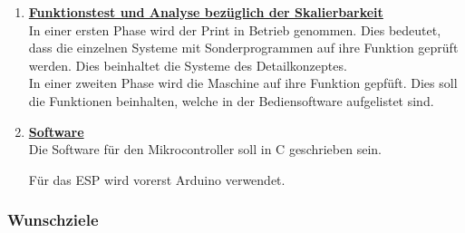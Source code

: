 \begin{enumerate}
\item \underline{\textbf{Funktionstest und Analyse bezüglich der Skalierbarkeit}}\mbox{}\\
			
In einer ersten Phase wird der Print in Betrieb genommen. Dies bedeutet, dass die einzelnen Systeme mit Sonderprogrammen auf ihre Funktion geprüft werden. Dies beinhaltet die Systeme des Detailkonzeptes.\\

In einer zweiten Phase wird die Maschine auf ihre Funktion gepfüft. Dies soll die Funktionen beinhalten, welche in der Bediensoftware aufgelistet sind.\\
			
			 
\item \underline{\textbf{Software}}\mbox{}\\

Die Software für den Mikrocontroller soll in C geschrieben sein. 
			
Für das ESP wird vorerst Arduino verwendet.
			
\end{enumerate}	
\newpage
\subsubsection{Wunschziele}\label{sec:Wunschziele}

